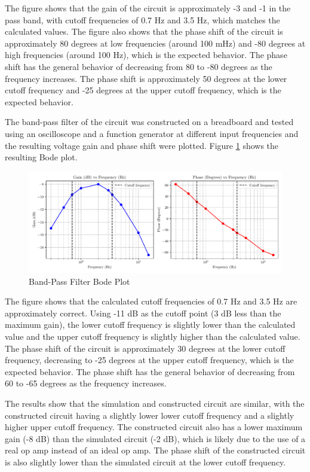 \documentclass[CMPE]{KGCOEReport}
\begin{document}
The figure shows that the gain of the circuit is approximately -3 and -1 in the pass band, with cutoff frequencies of 0.7 Hz and 3.5 Hz, which matches the calculated values. The figure also shows that the phase shift of the circuit is approximately 80 degrees at low frequencies (around 100 mHz) and -80 degrees at high frequencies (around 100 Hz), which is the expected behavior. The phase shift has the general behavior of decreasing from 80 to -80 degrees as the frequency increases. The phase shift is approximately 50 degrees at the lower cutoff frequency and -25 degrees at the upper cutoff frequency, which is the expected behavior.

The band-pass filter of the circuit was constructed on a breadboard and tested using an oscilloscope and a function generator at different input frequencies and the resulting voltage gain and phase shift were plotted. Figure \ref{fig:bandPassBode} shows the resulting Bode plot.

\begin{figure}[H]
    \centering
    \includegraphics[width=1\textwidth]{band_pass_plot.pdf}
    \caption{Band-Pass Filter Bode Plot}
    \label{fig:bandPassBode}
\end{figure}

The figure shows that the calculated cutoff frequencies of 0.7 Hz and 3.5 Hz are approximately correct. Using -11 dB as the cutoff point (3 dB less than the maximum gain), the lower cutoff frequency is slightly lower than the calculated value and the upper cutoff frequency is slightly higher than the calculated value. The phase shift of the circuit is approximately 30 degrees at the lower cutoff frequency, decreasing to -25 degrees at the upper cutoff frequency, which is the expected behavior. The phase shift has the general behavior of decreasing from 60 to -65 degrees as the frequency increases.

The results show that the simulation and constructed circuit are similar, with the constructed circuit having a slightly lower lower cutoff frequency and a slightly higher upper cutoff frequency. The constructed circuit also has a lower maximum gain (-8 dB) than the simulated circuit (-2 dB), which is likely due to the use of a real op amp instead of an ideal op amp. The phase shift of the constructed circuit is also slightly lower than the simulated circuit at the lower cutoff frequency.
\end{document}
